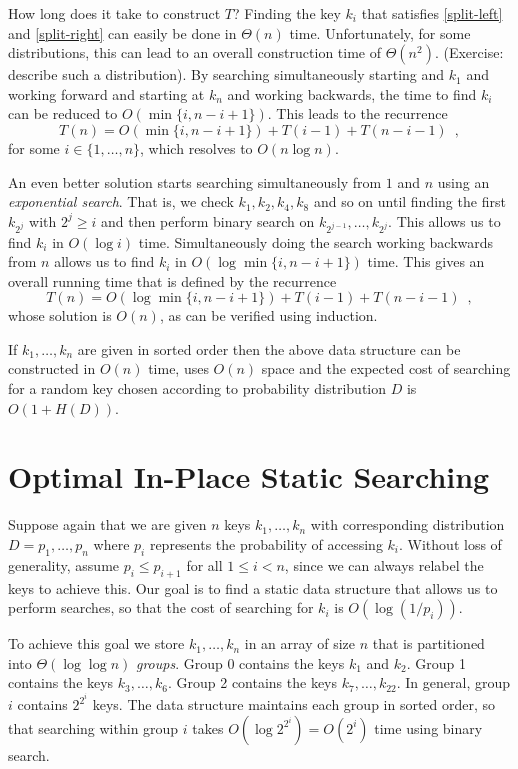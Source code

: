 How long does it take to construct $T$?  Finding the key $k_i$ that
satisfies \eqref{split-left} and \eqref{split-right} can easily be done in
$\Theta(n)$ time.  Unfortunately, for some distributions, this can lead
to an overall construction time of $\Theta(n^2)$. (Exercise: describe
such a distribution).  By searching simultaneously starting and $k_1$
and working forward and starting at $k_n$ and working backwards, the
time to find $k_i$ can be reduced to $O(\min\{i, n-i+1\})$.  This leads
to the recurrence
\[
   T(n) = O(\min\{i, n-i+1\}) + T(i-1) + T(n-i-1) \enspace ,
\]
for some $i\in \{1,\ldots, n\}$, which resolves to $O(n\log n)$.

An even better solution starts searching simultaneously from $1$ and $n$
using an \emph{exponential search}.  That is, we check $k_1, k_2, k_4,
k_8$ and so on until finding the first $k_{2^j}$ with $2^j \ge i$ and
then perform binary search on $k_{2^{j-1}},\ldots,k_{2^j}$. This allows
us to find $k_i$ in $O(\log i)$ time.  Simultaneously doing the search
working backwards from $n$ allows us to find $k_i$ in $O(\log \min\{i,
n-i+1\})$ time.  This gives an overall running time that is defined by the recurrence
\[
   T(n) = O(\log \min\{i, n-i+1\}) + T(i-1) + T(n-i-1) \enspace ,
\]
whose solution is $O(n)$, as can be verified using induction.

\begin{thm}
If $k_1,\ldots,k_n$ are given in sorted order then the above data
structure can be constructed in $O(n)$ time, uses $O(n)$ space and
the expected cost of searching for a random key chosen according to
probability distribution $D$ is $O(1+H(D))$.
\end{thm}


\section{Optimal In-Place Static Searching}

Suppose again that we are given $n$ keys $k_1,\ldots,k_n$ with
corresponding distribution $D=p_1,\ldots,p_n$ where $p_i$ represents
the probability of accessing $k_i$.  Without loss of generality, assume
$p_i\le p_{i+1}$ for all $1\le i< n$, since we can always relabel the
keys to achieve this.  Our goal is to find a static data structure that
allows us to perform searches, so that the cost of searching for $k_i$
is $O(\log (1/p_i))$.

To achieve this goal we store $k_1,\ldots,k_n$ in an array of size $n$
that is partitioned into $\Theta(\log\log n)$ \emph{groups}.  Group 0
contains the keys $k_1$ and $k_2$.  Group 1 contains the keys
$k_3,\ldots,k_6$.  Group 2 contains the keys $k_7,\ldots,k_{22}$.  In
general, group $i$ contains $2^{2^i}$ keys.  The data structure
maintains each group in sorted order, so that searching within group
$i$ takes $O(\log 2^{2^i})=O(2^i)$ time using binary search.

